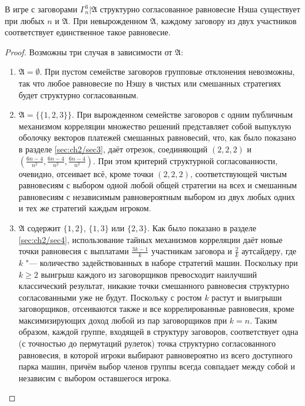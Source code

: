 \begin{theorem}
	В игре с заговорами $\Gamma^3_n | \mathfrak{A}$ структурно согласованное равновесие Нэша существует при любых $n$ и $\mathfrak{A}$. При невырожденном $\mathfrak{A}$, каждому заговору из двух участников соответствует единственное такое равновесие.
\end{theorem}

\begin{proof}
	Возможны три случая в зависимости от $\mathfrak{A}$:
	\begin{enumerate}
		\item $\mathfrak{A} = \emptyset$. При пустом семействе заговоров групповые отклонения невозможны, так что любое равновесие по Нэшу в чистых или смешанных стратегиях будет структурно согласованным.
		\item $\mathfrak{A} = \{\{1, 2, 3\}\}$. При вырожденном семействе заговоров с одним публичным механизмом корреляции множество решений представляет собой выпуклую оболочку векторов платежей смешанных равновесий, что, как было показано в разделе \ref{sec:ch2/sec3}, даёт отрезок, соединяющий $(2, 2, 2)$ и $(\frac{6 n - 4}{n^2}, \frac{6 n - 4}{n^2}, \frac{6 n - 4}{n^2})$. При этом критерий структурной согласованности, очевидно, отсеивает всё, кроме точки $(2, 2, 2)$, соответствующей чистым равновесиям с выбором одной любой общей стратегии на всех и смешанным равновесиям с независимым равновероятным выбором из двух любых одних и тех же стратегий каждым игроком.
		\item $\mathfrak{A}$ содержит $\{1, 2\}$, $\{1, 3\}$ или $\{2, 3\}$. Как было показано в разделе \ref{sec:ch2/sec4}, использование тайных механизмов корреляции даёт новые точки равновесия с выплатами $\frac{3k - 1}{k}$ участникам заговора и $\frac{2}{k}$ аутсайдеру, где $k$ "--- количество задействованных в наборе стратегий машин. Поскольку при $k \ge 2$ выигрыш каждого из заговорщиков превосходит наилучший классический результат, никакие точки смешанного равновесия структурно согласованными уже не будут. Поскольку с ростом $k$ растут и выигрыши заговорщиков, отсеиваются также и все коррелированные равновесия, кроме максимизирующих доход любой из пар заговорщиков при $k = n$. Таким образом, каждой группе, входящей в структуру заговоров, соответствует одна (с точностью до пермутаций рулеток) точка структурно согласованного равновесия, в которой игроки выбирают равновероятно из всего доступного парка машин, причём выбор членов группы всегда совпадает между собой и независим с выбором оставшегося игрока.
	\end{enumerate}
\end{proof}

